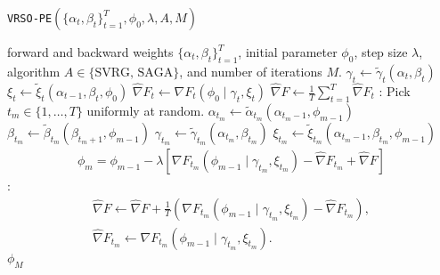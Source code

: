 

\begin{algorithm}
\caption{\texttt{VRSO-PE}$(\{\alpha_t,\beta_t\}_{t=1}^T,\phi_0,\lambda,A,M)$}\label{alg:SO}
\begin{algorithmic}[1]
\Require forward and backward weights $\{\alpha_t,\beta_t\}_{t=1}^T$, initial parameter $\phi_0$, step size $\lambda$, algorithm $A \in \{\text{SVRG, SAGA}\}$, and number of iterations $M$.
%
\vspace{5pt}
\State $\gamma_t \gets \tilde \gamma_t(\alpha_t,\beta_t)$
\State $\xi_t \gets \tilde \xi_t(\alpha_{t-1},\beta_{t},\phi_0)$
\State $\widehat \nabla F_t \leftarrow \nabla F_t (\phi_0 \mid \gamma_t,\xi_t)$
\EndFor
\State $\widehat \nabla F \gets \frac{1}{T} \sum_{t=1}^T \widehat \nabla F_{t}$
%
:
    \State Pick $t_{m} \in \{1,\ldots,T\}$ uniformly at random.
    \State $\alpha_{t_m} \gets \tilde \alpha_{t_m}(\alpha_{t_m-1},\phi_{m-1})$ 
    \State $\beta_{t_m} \gets \tilde \beta_{t_m}(\beta_{t_m+1},\phi_{m-1})$ 
    \State $\gamma_{t_m} \gets \tilde \gamma_{t_m}(\alpha_{t_m},\beta_{t_m})$
    \State $\xi_{t_m} \gets \tilde \xi_{t_m}(\alpha_{t_m-1},\beta_{t_m},\phi_{m-1})$
    \State {}
    \begin{gather}
        \phi_{m} = \phi_{m-1} - \lambda \left[\nabla F_{t_m}(\phi_{m-1} \mid \gamma_{t_m}, \xi_{t_m}) - \widehat \nabla F_{t_{m}} + \widehat \nabla F \right]
        \label{eqn:SAGA_update0}
    \end{gather}
    :
        \begin{gather}
            \widehat \nabla F \gets \widehat \nabla F + \frac{1}{T} \left( \nabla F_{t_m}(\phi_{m-1} \mid \gamma_{t_m}, \xi_{t_m}) - \widehat \nabla F_{t_{m}}\right), \\
            \widehat \nabla F_{t_{m}} \gets \nabla F_{t_m}(\phi_{m-1} \mid \gamma_{t_m}, \xi_{t_m}).
        \end{gather}
    \EndIf
\EndFor
\State \Return $\phi_M$
\end{algorithmic}
\end{algorithm}

